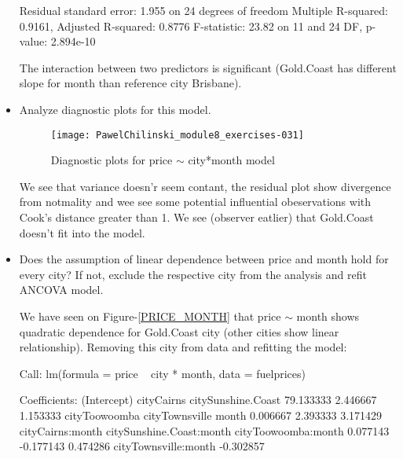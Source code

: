 \documentclass[a4paper]{article}
\begin{document}
\begin{itemize}
\begin{Schunk}
\begin{Soutput}
Residual standard error: 1.955 on 24 degrees of freedom
Multiple R-squared:  0.9161,	Adjusted R-squared:  0.8776 
F-statistic: 23.82 on 11 and 24 DF,  p-value: 2.894e-10
\end{Soutput}
\end{Schunk}
The interaction between two predictors is significant (Gold.Coast has
different slope for month than reference city Brisbane).

\item  Analyze diagnostic plots for this model.

\begin{figure}[H]
\begin{center}
\texttt{[image: PawelChilinski\_module8\_exercises-031]}
\caption{Diagnostic plots for price $\sim$ city*month model}
\end{center}
\end{figure}
We see that variance doesn'r seem contant, the residual plot show divergence
from notmality and wee see some potential influential obeservations with Cook's
distance greater than 1.
We see (observer eatlier) that Gold.Coast doesn't fit into the model.

\item  Does the assumption of linear dependence between price and month hold
for every city? If not, exclude the respective city from the analysis and refit
ANCOVA model.

We have seen on Figure-\ref{PRICE_MONTH} that price $\sim$ month shows quadratic
dependence for Gold.Coast city (other cities show linear relationship). Removing
this city from data and refitting the model:
\begin{Schunk}
\begin{Soutput}
Call:
lm(formula = price ~ city * month, data = fuelprices)

Coefficients:
             (Intercept)                cityCairns        citySunshine.Coast  
               79.133333                  2.446667                  1.153333  
           cityToowoomba            cityTownsville                     month  
                0.006667                  2.393333                  3.171429  
        cityCairns:month  citySunshine.Coast:month       cityToowoomba:month  
                0.077143                 -0.177143                  0.474286  
    cityTownsville:month  
               -0.302857  
\end{Soutput}
\end{Schunk}


\end{itemize}
\end{document}
